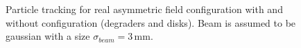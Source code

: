 \begin{figure}[!h]
	\begin{center}
		
	\end{center}
	\caption[Particle tracking for real asymmetric field configuration with and without configuration]{Particle tracking for real asymmetric field configuration with and without configuration (degraders and disks). Beam is assumed to be gaussian with a size $\sigma_{beam}=3\,\mathrm{mm}$.}
	\label{chap3:AsymTransversalProfile}
\end{figure}
